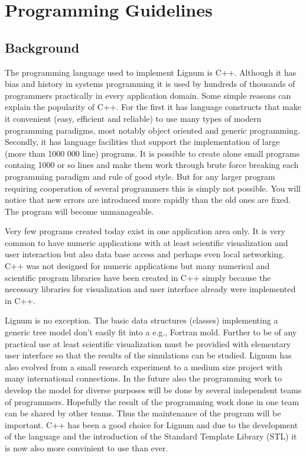 \section{Programming Guidelines}

\subsection{Background}
The programming language used to  implement Lignum is C++. Although it
has bias and history in systems  programming it is used by hundreds of
thousands of programmers practically in every application domain. Some
simple reasons can explain the popularity of C++. For the first it has
language  constructs  that make  it  convenient  (easy, efficient  and
reliable)  to use  many types  of modern  programming  paradigms, most
notably  object oriented  and generic  programming.  Secondly,  it has
language  facilities that  support the  implementation of  large (more
than 1000  000 line) programs.  It  is possible to  create alone small
programs containg  1000 or so lines  and make them  work through brute
force breaking each  programming paradigm and rule of  good style. But
for any  larger program  requiring cooperation of  several programmers
this  is simply not  possible.  You  will notice  that new  errors are
introduced more rapidly than the old ones are fixed.  The program will
become unmanageable.

Very few programs created today exist in one application area only. It
is very common  to have numeric applications with  at least scientific
visualization  and user  interaction  but also  data  base access  and
perhaps  even local  networking.   C++ was  not  designed for  numeric
applications but many numerical  and scientific program libraries have
been  created  in  C++  simply  because the  necessary  libraries  for
visualization and user interface already were implemented in C++. 

Lignum  is   no  exception.   The  basic   data  structures  (classes)
implementing  a generic  tree  model  don't easily  fit  into a  e.g.,
Fortran mold. Further  to be of any practical  use at least scientific
visualization must be providied with elementary user interface so that
the  results of  the  simulations  can be  studied.   Lignum has  also
evolved from a small research experiment to a medium size project with
many international  connections.  In  the future also  the programming
work to develop the model for diverse purposes will be done by several
independent  teams  of  programmers.   Hopefully  the  result  of  the
programming work done  in one team can be shared  by other teams. Thus
the maintenance of the program will  be important. C++ has been a good
choice for Lignum  and due to the development of  the language and the
introduction of  the Standard  Template Library (STL)  it is  now also
more convinient to use than ever.

